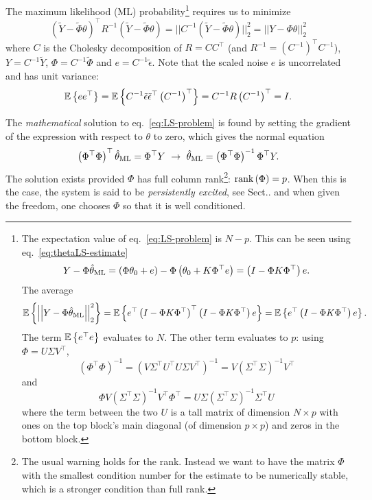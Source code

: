 The maximum likelihood (ML) probability\footnote{The expectation value of eq.~\eqref{eq:LS-problem} is $N-p$. This can be seen using eq.~\eqref{eq:thetaLS-estimate}
  \begin{equation*}
    Y-\Phi\hat{\theta}_\textrm{ML} = (\Phi\theta_0 + e) - \Phi\left(\theta_0 + K \Phi^\top e\right) = \left(I - \Phi K \Phi^\top\right)e.
  \end{equation*}
  The average
  \begin{equation*}
    \mathbb{E}\left\{\left|\left|Y - \Phi \hat{\theta}_\textrm{ML}\right|\right|_2^2\right\} = \mathbb{E}\left\{e^\top\left(I - \Phi K \Phi^\top\right)^\top\left(I - \Phi K \Phi^\top\right)e\right\} = \mathbb{E}\left\{e^\top\left(I - \Phi K \Phi^\top\right)e\right\}.
  \end{equation*}
  The term $\mathbb{E}\left\{e^\top e\right\}$ evaluates to $N$. The other term evaluates to $p$: using $\Phi = U\Sigma V^\top$,
  \begin{equation*}
    (\Phi^\top \Phi)^{-1} = \left(V\Sigma^\top U^\top U\Sigma V^\top\right)^{-1} = V\left(\Sigma^\top\Sigma\right)^{-1}V^\top
  \end{equation*}
  and
  \begin{equation*}
    \Phi V\left(\Sigma^\top\Sigma\right)^{-1}V^\top \Phi^\top = U\Sigma \left(\Sigma^\top\Sigma\right)^{-1}\Sigma^\top U
  \end{equation*}
where the term between the two $U$ is a tall matrix of dimension $N\times p$ with ones on the top block's main diagonal (of dimension $p\times p$) and zeros in the bottom block.} requires us to minimize
\begin{equation}
  \label{eq:LS-problem}
  (\tilde{Y} - \tilde{\Phi} \theta)^\top R^{-1} (\tilde{Y} - \tilde{\Phi} \theta) = ||C^{-1} (\tilde{Y} - \tilde{\Phi} \theta)||_2^2 = ||Y - \Phi \theta||_2^2
\end{equation}
where $C$ is the Cholesky decomposition of $R = C C^\top$ (and $R^{-1} = \left(C^{-1}\right)^\top C^{-1}$), $Y = C^{-1}\tilde{Y}$, $\Phi = C^{-1}\tilde{\Phi}$ and $e=C^{-1}\tilde{\epsilon}$. Note that the scaled noise $e$ is uncorrelated and has unit variance:
\begin{equation*}
  \mathbb{E}\left\{e e^\top\right\} = \mathbb{E}\left\{C^{-1}\tilde{\epsilon} \tilde{\epsilon}^\top \left(C^{-1}\right)^\top\right\} = C^{-1}R \left(C^{-1}\right)^\top = I.
\end{equation*}

The \emph{mathematical} solution to eq.~\eqref{eq:LS-problem} is found by setting the gradient of the expression with respect to $\theta$ to zero, which gives the normal equation
\begin{equation}
  \label{eq:LS-estimator}
  \left(\Phi^\top\Phi\right)^\top \thetaLS = \Phi^\top Y\ \rightarrow\ \thetaLS = \left(\Phi^\top \Phi\right)^{-1} \Phi^\top Y.
\end{equation}
The solution exists provided $\Phi$ has full column rank\footnote{The usual warning holds for the rank. Instead we want to have the matrix $\Phi$ with the smallest condition number for the estimate to be numerically stable, which is a stronger condition than full rank.}: $\textrm{rank}\left(\Phi\right) = p$. When this is the case, the system is said to be \emph{persistently excited}, see Sect.. and when given the freedom, one chooses $\Phi$ so that it is well conditioned.

